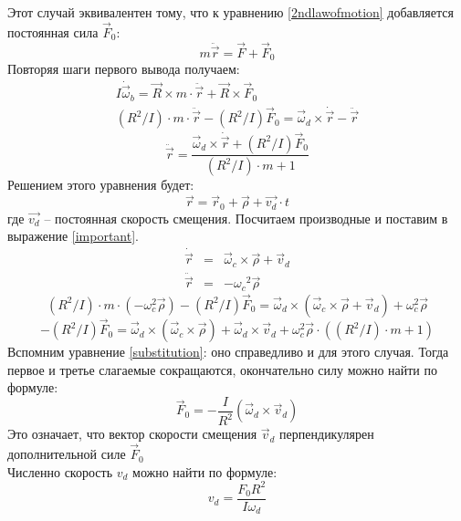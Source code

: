 \documentclass[a4paper,12pt]{article}
\begin{document}
	
	Этот случай эквивалентен тому, что к уравнению \eqref{2ndlawofmotion} добавляется постоянная сила $\vec{F}_0$:
	\begin{equation}
		\label{const_force}
		m\ddot{\vec{r}}=\vec{F}+\vec{F}_0
	\end{equation}
	Повторяя шаги первого вывода получаем:
	\begin{eqnarray}
		I\dot{\vec{\omega}}_b=\vec{R}\times m\cdot\ddot{\vec{r}}+\vec{R}\times \vec{F}_0\\
		(R^2/I)\cdot m \cdot \ddot{\vec{r}}-(R^2/I)\vec{F}_0=\vec{\omega}_d\times\dot{\vec{r}}-\ddot{\vec{r}} \label{important}
	\end{eqnarray}
	\begin{equation}
		\label{ddotr2}
			\ddot{\vec{r}}=\frac{\vec{\omega}_d \times \dot{\vec{r}}+(R^2/I)\vec{F}_0}{(R^2/I)\cdot m + 1}
	\end{equation}
	Решением этого уравнения будет:
	\begin{equation}
		\label{sol}
		\vec{r}=\vec{r}_0+\vec{\rho}+\vec{v_d}\cdot t
	\end{equation}
	где $\vec{v_d}$ -- постоянная скорость смещения. Посчитаем производные и поставим в выражение \eqref{important}.
	\begin{eqnarray}
		\dot{\vec{r}}&=&\vec{\omega}_c\times\vec{\rho} + \vec{v}_d\\
		\ddot{\vec{r}}&=&-{\omega_c}^2\vec{\rho}
	\end{eqnarray}
	\begin{equation}
		(R^2/I)\cdot m \cdot (-\omega_c^2\vec{\rho})-(R^2/I) \vec{F}_0=\vec{\omega}_d\times(\vec{\omega}_c\times\vec{\rho}+\vec{v}_d)+\omega_c^2\vec{\rho}
	\end{equation}
	\begin{equation}
		-(R^2/I)\vec{F}_0=\vec{\omega}_d\times (\vec{\omega}_c\times\vec{\rho})+\vec{\omega}_d\times\vec{v}_d+\omega_c^2\vec{\rho}\cdot((R^2/I)\cdot m + 1)
	\end{equation}
	Вспомним уравнение \eqref{substitution}: оно справедливо и для этого случая. Тогда первое и третье слагаемые сокращаются, окончательно силу можно найти по формуле:
	\begin{equation}
		\label{force_0}
		\vec{F}_0=-\frac{I}{R^2}(\vec{\omega}_d\times\vec{v}_d)
	\end{equation}
	Это означает, что вектор скорости смещения $\vec{v}_d$ перпендикулярен дополнительной силе $\vec{F}_0$\\
	Численно скорость $v_d$ можно найти по формуле:
	\begin{equation}
		\label{v_h}
		v_d=\frac{F_0 R^2}{I\omega_d}
	\end{equation}
\end{document}
